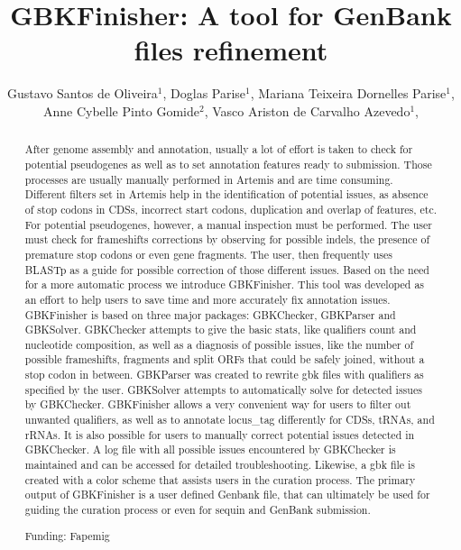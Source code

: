 \documentclass[twoside]{article}
\title{\vspace{-15mm}\fontsize{24pt}{10pt}\selectfont\textbf{ GBKFinisher: A tool for GenBank files refinement }} %
\author{ Gustavo Santos de Oliveira$^{1}$, Doglas Parise$^{1}$, Mariana Teixeira Dornelles Parise$^{1}$, Anne Cybelle Pinto Gomide$^{2}$, Vasco Ariston de Carvalho Azevedo$^{1}$, }
\affil{ 1 Universidade Federal de Minas Gerais

2 Federal University of Minas Gerais

 }
\date{}
\begin{document}
  
  
  \maketitle %
  
  
  \thispagestyle{fancy} %
  
  
  \begin{abstract}
  After genome assembly and annotation, usually a lot of effort is taken to check for potential pseudogenes as well as to set annotation features ready to submission. Those processes are usually manually performed in Artemis and are time consuming. Different filters set in Artemis help in the identification of potential issues, as absence of stop codons in CDSs, incorrect start codons, duplication and overlap of features, etc. For potential pseudogenes, however, a manual inspection must be performed. The user must check for frameshifts corrections by observing for possible indels, the presence of premature stop codons or even gene fragments. The user, then frequently uses BLASTp as a guide for possible correction of those different issues. Based on the need for a more automatic process we introduce GBKFinisher. This tool was developed as an effort to help users to save time and more accurately fix annotation issues. GBKFinisher is based on three major packages: GBKChecker, GBKParser and GBKSolver. GBKChecker attempts to give the basic stats, like qualifiers count and nucleotide composition, as well as a diagnosis of possible issues, like the number of possible frameshifts, fragments and split ORFs that could be safely joined, without a stop codon in between. GBKParser was created to rewrite gbk files with qualifiers as specified by the user. GBKSolver attempts to automatically solve for detected issues by GBKChecker.  GBKFinisher allows a very convenient way for users to filter out unwanted qualifiers, as well as to annotate locus\_tag differently for CDSs, tRNAs, and rRNAs. It is also possible for users to manually correct potential issues detected in GBKChecker. A log file with all possible issues encountered by GBKChecker is maintained and can be accessed for detailed troubleshooting. Likewise, a gbk file is created with a color scheme that assists users in the curation process. The primary output of GBKFinisher is a user defined Genbank file, that can ultimately be used for guiding the curation process or even for sequin and GenBank submission.
  
  Funding: Fapemig \\ 
  \end{abstract}
  
\end{document}

